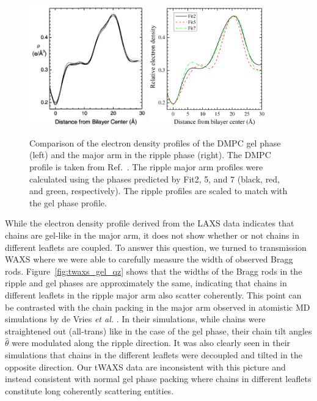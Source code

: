 \begin{figure}[htbp]
  \centering
  \includegraphics[width=0.45\textwidth]{figures/ripple/discussion/Tristram-Nagle_gel_DMPC}
  \includegraphics[width=0.45\textwidth]{figures/ripple/discussion/major_edp}
  \caption{Comparison of the electron density profiles of the DMPC gel phase (left)
  and the major arm in the ripple phase (right). The DMPC profile is taken from 
  Ref.~\cite{Tristram-Nagle02}. The ripple major arm profiles were calculated 
  using the phases predicted by Fit2, 5, and 7 (black, red, and green, respectively). 
  The ripple profiles are scaled to match 
  with the gel phase profile.}
  \label{fig:gel_comparison}
\end{figure}

While the electron density profile derived from the LAXS data indicates that 
chains are gel-like in the major arm, it does not show whether or not chains 
in different leaflets are coupled. To answer this question, we turned to
transmission WAXS where we were able to carefully measure the width of 
observed Bragg rods. Figure~\ref{fig:twaxs_gel_qz} shows that the widths of the Bragg
rods in the ripple and gel phases are approximately the same, indicating that
chains in different leaflets in the ripple major arm also scatter coherently.
This point can be contrasted with the chain packing in the major arm
observed in atomistic MD simulations by de Vries \textit{et al.} \cite{ref:deVries05}.
In their simulations, while chains were straightened out (all-trans) like in 
the case of the gel phase, their chain tilt angles $\hat{\theta}$ were modulated 
along the ripple direction. It was also
clearly seen in their simulations that chains in the different leaflets were 
decoupled and tilted in the opposite direction. Our tWAXS data are 
inconsistent with this picture and instead consistent with normal
gel phase packing where chains in different leaflets constitute long coherently
scattering entities.

